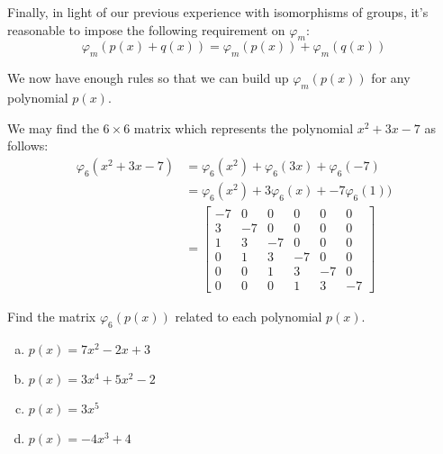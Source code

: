 Finally, in light of our previous experience with isomorphisms of groups, it's reasonable to impose the following requirement on $\varphi_m$:
\[
\varphi_m( p(x) + q(x)) = \varphi_m( p(x)) +\varphi_m(q(x)) \]

We now have enough rules so that we can build up $\varphi_m(p(x))$ for any polynomial $p(x)$.

\begin{example}{}
We may find the $6\times 6$ matrix which represents the polynomial $x^2+3x-7$ as follows:
\begin{align*}
\varphi_6(x^2 + 3x -7) &=\varphi_6(x^2) + \varphi_6(3x) + \varphi_6(-7) \\
&=\varphi_6(x^2) + 3\varphi_6(x) + -7 \varphi_6(1))\\
&= \left[\begin{array}{cccccc}-7 & 0 & 0 & 0 & 0 & 0\\3 & -7 & 0 & 0 & 0 & 0\\1 & 3 & -7 & 0 & 0 & 0\\0 & 1 & 3 & -7 & 0 & 0\\0 & 0 & 1 & 3 & -7 & 0\\0 & 0 & 0 & 1 & 3 & -7\end{array}\right]
\end{align*}
\end{example}
 
\begin{exercise}{}
Find the matrix $\varphi_6(p(x))$ related to each polynomial $p(x)$.
\begin{multicols}{2}
\begin{enumerate}[(a)]
\item
$p(x) = 7x^2 - 2x + 3$
\item
$p(x) = 3x^4 + 5x^2 - 2$
\item
$p(x) = 3x^5$
\item
$p(x) = -4x^3 + 4$ 
\end{enumerate}
\end{multicols}
\end{exercise}

